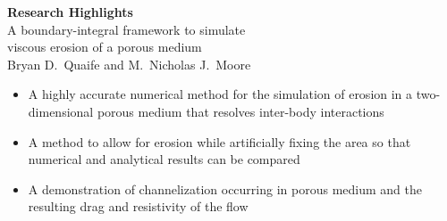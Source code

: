 \documentclass[11pt]{article}
\begin{document}
\begin{center}
  {\bf Research Highlights} \\
  A boundary-integral framework to simulate \\ viscous erosion of a
  porous medium \\
  Bryan D.~Quaife and M.~Nicholas J.~Moore
\end{center}

\begin{itemize}
  \item A highly accurate numerical method for the simulation of erosion
    in a two-dimensional porous medium that resolves inter-body
    interactions
  \item A method to allow for erosion while artificially fixing the area
    so that numerical and analytical results can be compared
  \item A demonstration of channelization occurring in porous medium and
    the resulting drag and resistivity of the flow

\end{itemize}
\end{document}
